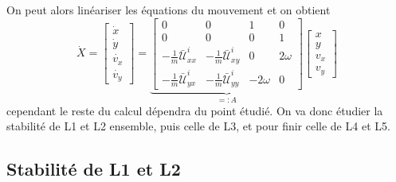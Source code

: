 \documentclass[12pt]{article}
\begin{document}
	On peut alors linéariser les équations du mouvement et on obtient
	\begin{equation}
		\label{eq du mvt}
		\dot{X}
		=
		\begin{bmatrix}
			\dot{x} \\
			\dot{y} \\
			\dot{v_x} \\
			\dot{v_y}
		\end{bmatrix}
		=
		\underbrace{
			\begin{bmatrix}
				0 & 0 & 1 & 0 \\
				0 & 0 & 0 & 1 \\
				-\frac{1}{m}\bar{\mathcal{U}}_{xx}^i & -\frac{1}{m}\bar{\mathcal{U}}_{xy}^i
				& 0 & 2\omega \\
				-\frac{1}{m}\bar{\mathcal{U}}_{yx}^i & -\frac{1}{m}\bar{\mathcal{U}}_{yy}^i
				& -2\omega & 0
			\end{bmatrix}
		}_{=: A}
		\begin{bmatrix}
			x \\ y \\ v_x \\ v_y
		\end{bmatrix}
	\end{equation}
	cependant le reste du calcul dépendra du point étudié. On va donc étudier la stabilité de L1 et L2 ensemble, puis celle de L3, et pour finir celle de L4 et L5.
	
	
	\subsection{Stabilité de L1 et L2}
\end{document}
